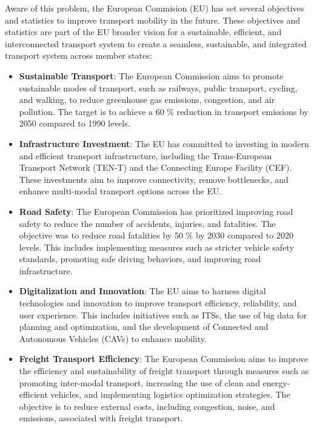 Aware of this problem, the European Commision (EU) has set several objectives and statistics to improve transport mobility in the future. These objectives and statistics are part of the EU broader vision for a sustainable, efficient, and interconnected transport system to create a seamless, sustainable, and integrated transport system across member states:

\begin{itemize}
	\item \textbf{Sustainable Transport}: The European Commission aims to promote sustainable modes of transport, such as railways, public transport, cycling, and walking, to reduce greenhouse gas emissions, congestion, and air pollution. The target is to achieve a 60 \% reduction in transport emissions by 2050 compared to 1990 levels.
	
	\item \textbf{Infrastructure Investment}: The EU has committed to investing in modern and efficient transport infrastructure, including the Trans-European Transport Network (TEN-T) and the Connecting Europe Facility (CEF). These investments aim to improve connectivity, remove bottlenecks, and enhance multi-modal transport options across the EU.
	
	\item \textbf{Road Safety}: The European Commission has prioritized improving road safety to reduce the number of accidents, injuries, and fatalities. The objective was to reduce road fatalities by 50 \% by 2030 compared to 2020 levels. This includes implementing measures such as stricter vehicle safety standards, promoting safe driving behaviors, and improving road infrastructure.
	
	\item \textbf{Digitalization and Innovation}: The EU aims to harness digital technologies and innovation to improve transport efficiency, reliability, and user experience. This includes initiatives such as \acp{ITS}, the use of big data for planning and optimization, and the development of Connected and Autonomous Vehicles (CAVs) to enhance mobility.
	
	\item \textbf{Freight Transport Efficiency}: The European Commission aims to improve the efficiency and sustainability of freight transport through measures such as promoting inter-modal transport, increasing the use of clean and energy-efficient vehicles, and implementing logistics optimization strategies. The objective is to reduce external costs, including congestion, noise, and emissions, associated with freight transport.
\end{itemize}
 
